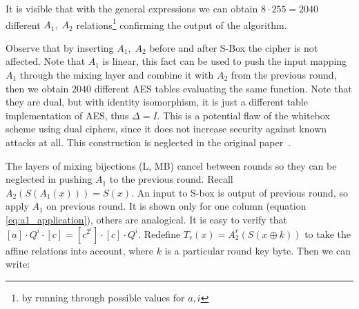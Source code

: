 \documentclass[11pt,oneside,final]{fithesis2}
\begin{document}
	It is visible that with the general expressions we can obtain $8 \cdot 255 = 2040$ different 
	$A_1,\;A_2$ relations\footnote{by running through possible values for $a,i$ } confirming the output of the algorithm. 
	
	Observe that by inserting $A_1,\;A_2$ before and after S-Box the cipher is not affected. Note that $A_1$ is linear, this fact can be used to 
	push the input mapping $A_1$ through the mixing layer and combine it with $A_2$ from the previous round, then we obtain $2040$ different AES 
	tables evaluating the same function. Note that they are dual, but with identity isomorphism, it is just a different 
	table implementation of AES, thus $\Delta = I$. This is a potential flaw of the whitebox scheme using dual ciphers, since it does not increase
	security against known attacks at all. This construction is neglected in the original paper~\citep{Karroumi:2010:PWA:2041036.2041060}.
	
	The layers of mixing bijections (L, MB) cancel between rounds so they can be neglected in pushing $A_1$ to the previous round. 
	Recall $A_2\left(S\left(A_1\left(x\right)\right)\right) = S(x)$. An input to S-box is output of previous round, so apply $A_1$ on previous round.
	It is shown only for one column (equation \ref{eq:a1_application}), others are analogical. It is easy to verify that 
	$\left[a\right] \cdot Q^i \cdot \left[c\right] = \left[c^{2^{i}}\right] \cdot \left[c\right] \cdot Q^i$. 
	Redefine $T_r(x) = A_2^r(S(x \oplus k))$ to take the affine relations into account, where $k$ is a particular round key byte. Then we can write:

	
\end{document}
